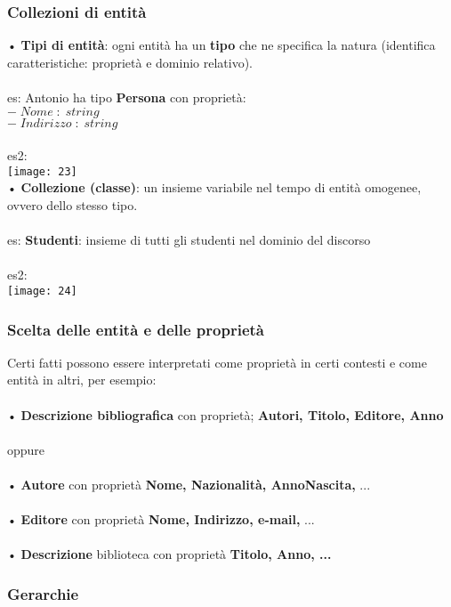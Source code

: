 \documentclass[12pt, letterpaper]{article}
\begin{document}
\subsubsection{Collezioni di entità}

• \textbf{Tipi di entità}: ogni entità ha un \textbf{tipo} che ne specifica la natura (identifica caratteristiche: proprietà e dominio relativo).
\\
\\
es: Antonio ha tipo \textbf{Persona} con proprietà:\\
$-\;Nome\;:\; string$\\
$-\;Indirizzo\;:\; string$\\
\\
es2:\\
\texttt{[image: 23]}
\\
• \textbf{Collezione (classe)}: un insieme variabile nel tempo di entità omogenee, ovvero dello stesso tipo.
\\
\\
es: \textbf{Studenti}: insieme di tutti gli studenti nel dominio del discorso 
\\
\\
es2:\\
\texttt{[image: 24]}

\subsubsection{Scelta delle entità e delle proprietà}

Certi fatti possono essere interpretati come proprietà in certi contesti e come entità in altri, per esempio:\\
\\
• \textbf{Descrizione bibliografica} con proprietà; \textbf{Autori, Titolo, Editore, Anno}\\
\\oppure\\
\\
• \textbf{Autore} con proprietà \textbf{Nome, Nazionalità, AnnoNascita, }...\\
\\• \textbf{Editore} con proprietà \textbf{Nome, Indirizzo, e-mail,} ...\\
\\• \textbf{Descrizione} biblioteca con proprietà \textbf{Titolo, Anno, ... }

\subsubsection{Gerarchie}
\end{document}
